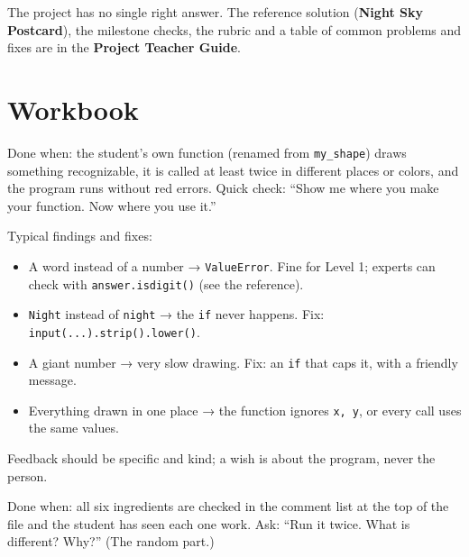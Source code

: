 
\begin{teachernote}
The project has no single right answer. The reference solution (\textbf{Night Sky Postcard}), the milestone checks, the rubric and a table of common problems and fixes are in the \textbf{Project Teacher Guide}.
\end{teachernote}

\section{Workbook}
\begin{answer}
Done when: the student's own function (renamed from \texttt{my\_shape}) draws something recognizable, it is called at least twice in different places or colors, and the program runs without red errors. Quick check: \enquote{Show me where you make your function. Now where you use it.}
\end{answer}

\begin{answer}
Typical findings and fixes:
\begin{itemize}[leftmargin=1.2em,itemsep=1pt]
  \item A word instead of a number → \texttt{ValueError}. Fine for Level 1; experts can check with \texttt{answer.isdigit()} (see the reference).
  \item \texttt{Night} instead of \texttt{night} → the \texttt{if} never happens. Fix: \texttt{input(...).strip().lower()}.
  \item A giant number → very slow drawing. Fix: an \texttt{if} that caps it, with a friendly message.
  \item Everything drawn in one place → the function ignores \texttt{x, y}, or every call uses the same values.
\end{itemize}
Feedback should be specific and kind; a wish is about the program, never the person.
\end{answer}

\begin{answer}
Done when: all six ingredients are checked in the comment list at the top of the file and the student has seen each one work. Ask: \enquote{Run it twice. What is different? Why?} (The random part.)
\end{answer}

